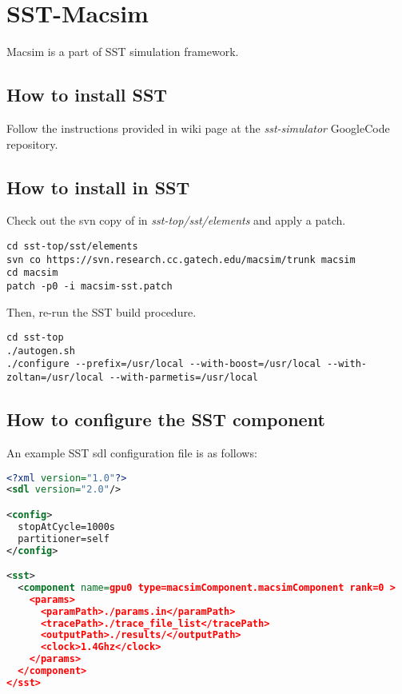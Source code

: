 
\clearpage
\section{SST-Macsim}

Macsim is a part of SST simulation framework.

\subsection{How to install SST}

Follow the instructions provided in wiki page at 
the \textit{sst-simulator} GoogleCode repository.

\subsection{How to install \SIM in SST}

Check out the svn copy of \SIM in \textit{sst-top/sst/elements} and
apply a patch. 

\smallskip
\begin{lstlisting}
cd sst-top/sst/elements
svn co https://svn.research.cc.gatech.edu/macsim/trunk macsim
cd macsim
patch -p0 -i macsim-sst.patch
\end{lstlisting}
\smallskip

Then, re-run the SST build procedure.

\smallskip
\begin{lstlisting}
cd sst-top
./autogen.sh
./configure --prefix=/usr/local --with-boost=/usr/local --with-zoltan=/usr/local --with-parmetis=/usr/local
\end{lstlisting}
\smallskip

\subsection{How to configure the \SIM SST component}

An example SST sdl configuration file is as follows:

\smallskip
\begin{lstlisting}[language=xml]
<?xml version="1.0"?>
<sdl version="2.0"/>

<config>
  stopAtCycle=1000s
  partitioner=self
</config>

<sst>
  <component name=gpu0 type=macsimComponent.macsimComponent rank=0 >
    <params>
      <paramPath>./params.in</paramPath>
      <tracePath>./trace_file_list</tracePath>
      <outputPath>./results/</outputPath>
      <clock>1.4Ghz</clock>
    </params>
  </component>
</sst>
\end{lstlisting}
\smallskip


